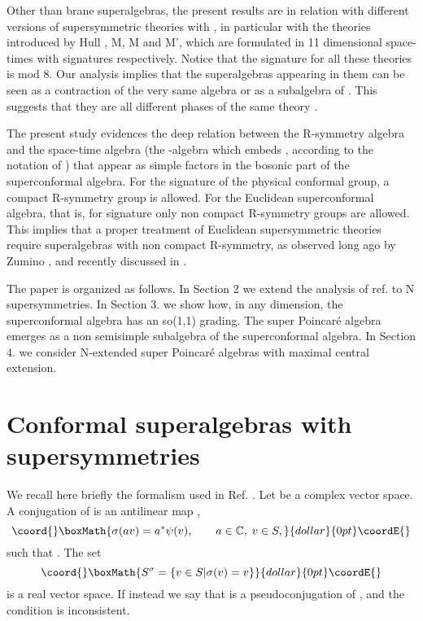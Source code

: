 \documentclass[a4paper,12pt]{article}
\begin{document}
Other than brane superalgebras, the present results are in
relation with different versions of supersymmetric theories with
\coordHE{}, in particular with the theories introduced by Hull
\cite{hu}, M, M\myHighlight{$^*$}\coordHE{} and M', which are formulated in 11 dimensional
space-times with signatures \coordHE{}
respectively. Notice that the signature for all these theories is
\coordHE{} mod 8. Our analysis implies that the superalgebras
appearing in them  can be seen  as a contraction of the very same
\coordHE{} algebra or as a subalgebra of \coordHE{}. This suggests that they are all different phases of the
same theory \cite{hu, fe}.

The present study evidences  the deep relation between the
R-symmetry algebra and the space-time algebra (the
\coordHE{}-algebra which embeds \coordHE{}, according to
the notation of \cite{dflv} ) that appear as simple factors in the
bosonic part of the superconformal algebra. For the signature of
the physical conformal group, \coordHE{} a compact R-symmetry
group is allowed. For the Euclidean superconformal algebra, that
is, for signature \coordHE{} only non compact R-symmetry
groups are allowed. This implies that a proper treatment of
Euclidean supersymmetric theories require superalgebras with non
compact R-symmetry, as observed long ago by Zumino \cite{zu}, and
recently discussed in \cite{si,mc,bvv}.

The paper is organized as follows. In Section 2 we extend the
analysis of ref. \cite{dflv} to N supersymmetries. In Section 3.
we show how, in any dimension, the superconformal algebra has an
so(1,1) grading. The super  Poincar\'e algebra emerges as a non
semisimple subalgebra of the superconformal algebra. In Section 4.
we consider N-extended super Poincar\'e algebras with maximal
central extension.






\section{Conformal superalgebras with \coordHE{} supersymmetries}

We recall here briefly the formalism used in Ref. \cite{dflv}. Let
 \coordHE{} be a complex vector space. A conjugation of \coordHE{} is
an antilinear  map \coordHE{},
$$\coord{}\boxMath{\sigma(av)=a^*\psi(v), \qquad a\in \C,\; v\in S,}{dollar}{0pt}\coordE{}$$ such that
\coordHE{}. The set $$\coord{}\boxMath{S^\sigma=\{v\in S|\sigma(v)=v\}}{dollar}{0pt}\coordE{}$$ is a
real vector space. If instead \coordHE{} we say that \myHighlight{$\sigma$}\coordHE{}
is a pseudoconjugation of \coordHE{}, and the condition \coordHE{} is
inconsistent.
\end{document}
